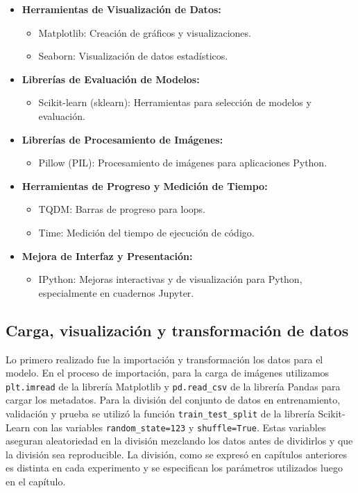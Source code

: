 \begin{itemize}
   \item \textbf{Herramientas de Visualización de Datos:}
   \begin{itemize}
       \item Matplotlib: Creación de gráficos y visualizaciones.
       \item Seaborn: Visualización de datos estadísticos.
   \end{itemize}

   \item \textbf{Librerías de Evaluación de Modelos:}
   \begin{itemize}
       \item Scikit-learn (sklearn): Herramientas para selección de modelos y evaluación.
   \end{itemize}

   \item \textbf{Librerías de Procesamiento de Imágenes:}
   \begin{itemize}
       \item Pillow (PIL): Procesamiento de imágenes para aplicaciones Python.
   \end{itemize}

   \item \textbf{Herramientas de Progreso y Medición de Tiempo:}
   \begin{itemize}
       \item TQDM: Barras de progreso para loops.
       \item Time: Medición del tiempo de ejecución de código.
   \end{itemize}

   \item \textbf{Mejora de Interfaz y Presentación:}
   \begin{itemize}
       \item IPython: Mejoras interactivas y de visualización para Python, especialmente en cuadernos Jupyter.
   \end{itemize}
\end{itemize}


\subsection*{Carga, visualización y transformación de datos}

Lo primero realizado fue la importación y transformación los datos para el modelo. En el proceso de importación, para la carga de imágenes utilizamos \texttt{plt.imread} de la librería Matplotlib y \texttt{pd.read\_csv} de la librería Pandas para cargar los metadatos. Para la división del conjunto de datos en entrenamiento, validación y prueba se utilizó la función \texttt{train\_test\_split} de la librería Scikit-Learn con las variables \texttt{random\_state=123} y \texttt{shuffle=True}. Estas variables aseguran aleatoriedad en la división mezclando los datos antes de dividirlos y que la división sea reproducible. La división, como se expresó en capítulos anteriores es distinta en cada experimento y se especifican los parámetros utilizados luego en el capítulo.


